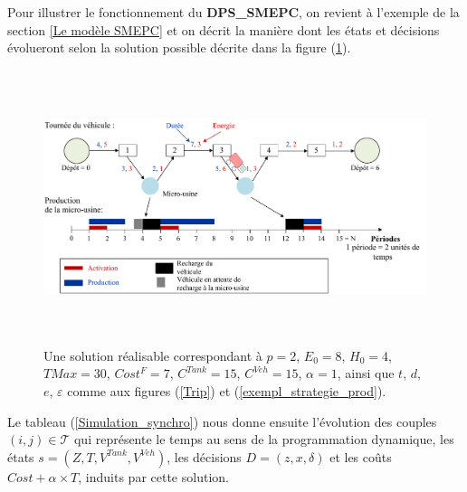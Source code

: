 Pour illustrer le fonctionnement du \textbf{DPS\_SMEPC}, on revient à l'exemple de la section \ref{Le modèle SMEPC} et on décrit la manière dont les états et décisions évolueront selon la solution possible décrite dans la figure (\ref{Synchro_exemple}).
\begin{figure}[H]
	\centerline{
		\includegraphics[height=8cm]{images_these/Synchro_exemple.pdf}}
	\caption[Synchonisation du problème VD et du problème PM]{Une solution réalisable correspondant à $p=2$, $E_0=8$, $H_0=4$, $TMax=30$, $Cost^F=7$, $C^{Tank}=15$, $C^{Veh}=15$, $\alpha=1$, ainsi que $t$, $d$, $e$, $\varepsilon$ comme aux figures (\ref{Trip}) et (\ref{exempl_strategie_prod}).}
	\label{Synchro_exemple}
\end{figure}

Le tableau (\ref{Simulation_synchro}) nous donne ensuite l'évolution des couples $(i, j) \in \mathcal{T}$ qui représente le temps au sens de la programmation dynamique, les états $s = (Z, T, V^{Tank}, V^{Veh})$, les décisions $D = (z, x, \delta)$ et les coûts $Cost + \alpha \times T$, induits par cette solution.

